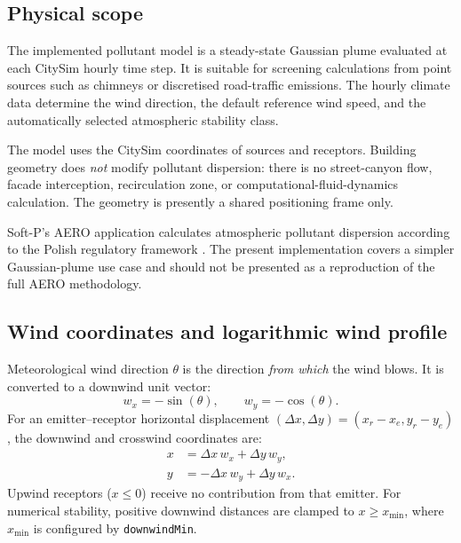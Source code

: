 \documentclass[11pt,a4paper]{article}
\newcommand{\code}[1]{\texttt{#1}}
\begin{document}
\subsection{Physical scope}

The implemented pollutant model is a steady-state Gaussian plume evaluated at
each CitySim hourly time step. It is suitable for screening calculations from
point sources such as chimneys or discretised road-traffic emissions. The
hourly climate data determine the wind direction, the default reference wind
speed, and the automatically selected atmospheric stability class.

The model uses the CitySim coordinates of sources and receptors. Building
geometry does \emph{not} modify pollutant dispersion: there is no street-canyon
flow, facade interception, recirculation zone, or computational-fluid-dynamics
calculation. The geometry is presently a shared positioning frame only.

Soft-P's AERO application calculates atmospheric pollutant dispersion according
to the Polish regulatory framework \cite{softp-aero,polish-regulation}. The
present implementation covers a simpler Gaussian-plume use case and should not
be presented as a reproduction of the full AERO methodology.

\subsection{Wind coordinates and logarithmic wind profile}

Meteorological wind direction $\theta$ is the direction \emph{from which} the
wind blows. It is converted to a downwind unit vector:
\begin{equation}
  w_x = -\sin(\theta), \qquad w_y = -\cos(\theta).
\end{equation}
For an emitter--receptor horizontal displacement
$(\Delta x,\Delta y)=(x_r-x_e,y_r-y_e)$, the downwind and crosswind coordinates
are:
\begin{align}
  x &= \Delta x\,w_x + \Delta y\,w_y, \\
  y &= -\Delta x\,w_y + \Delta y\,w_x.
\end{align}
Upwind receptors ($x\leq0$) receive no contribution from that emitter. For
numerical stability, positive downwind distances are clamped to
$x\geq x_{\min}$, where $x_{\min}$ is configured by \code{downwindMin}.
\end{document}
